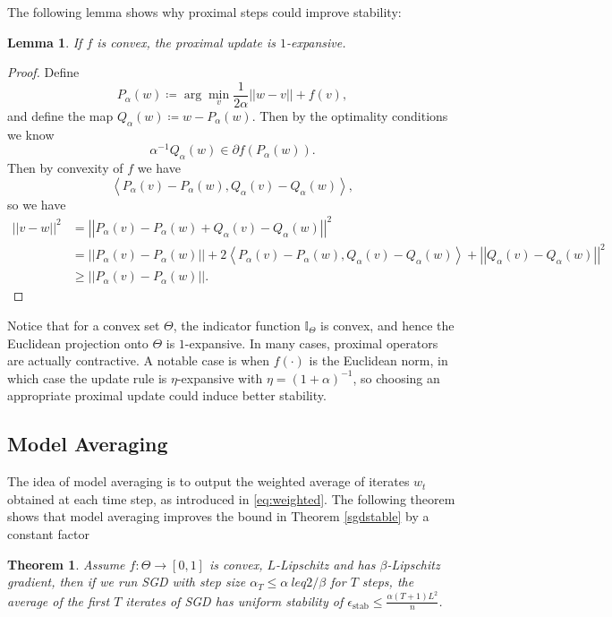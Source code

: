 \documentclass{article}[12pt]
\newtheorem{theorem}{Theorem}
\newtheorem{lemma}{Lemma}
\newcommand{\norm}[1]{\left|\left|#1\right|\right|}
\newcommand{\innprod}[2]{\left\langle#1, #2\right\rangle}
\begin{document}
The following lemma shows why proximal steps could improve stability:
\begin{lemma} \label{proximal}
   If $f$ is convex, the proximal update is $1$-expansive.
\end{lemma}
\begin{proof}
  Define 
  \[
  P_\alpha(w) \coloneqq \arg\min_v \frac{1}{2\alpha} \norm{w-v} + f(v),   
  \] and define the map $Q_\alpha(w) \coloneqq w - P_\alpha(w)$. Then by the optimality conditions we know 
  \[
   \alpha^{-1} Q_\alpha(w) \in \partial f(P_\alpha(w)). 
  \] 
  Then by convexity of $f$ we have 
    \[
      \innprod{P_\alpha(v) - P_\alpha(w)}{Q_\alpha(v) - Q_\alpha(w)},  
   \] so we have 
  \begin{align*}
  \norm{v-w}^2 &= \norm{P_\alpha(v) - P_\alpha(w) + Q_\alpha(v) - Q_\alpha(w)}^2 \\ 
  &= \norm{P_\alpha(v) - P_\alpha(w)} + 2 \innprod{P_\alpha(v) - P_\alpha(w)}{Q_\alpha(v) - Q_\alpha(w)} + \norm{Q_\alpha(v) - Q_\alpha(w)}^2 \\
  &\geq \norm{P_\alpha(v) - P_\alpha(w)}.
  \end{align*}
\end{proof}
Notice that for a convex set $\Theta$, the indicator function $\mathbb{I}_{\Theta}$ is convex, and hence the Euclidean projection onto $\Theta$ is $1$-expansive.
In many cases, proximal operators are actually contractive. A notable case is when $f(\cdot)$ is the Euclidean norm, in which case the update rule is $\eta$-expansive with $\eta = (1+\alpha)^{-1}$, so choosing an appropriate proximal update could induce better stability.

\subsection{Model Averaging} 
The idea of model averaging is to output the weighted average of iterates $w_t$ obtained at each time step, as introduced in \ref{eq:weighted}. The following theorem shows that model averaging improves the bound in Theorem \ref{sgdstable} by a constant factor  
\begin{theorem} \label{averaging}
   Assume $f: \Theta \to [0, 1]$ is convex, $L$-Lipschitz and has $\beta$-Lipschitz gradient, then if we run SGD with step size $\alpha_T \leq \alpha\ leq 2/\beta$ for $T$ steps, the average of the first $T$ iterates of SGD has uniform stability of $\epsilon_{\text{stab}} \leq \frac{\alpha (T+1)L^2}{n}$.
\end{theorem}
\end{document}
